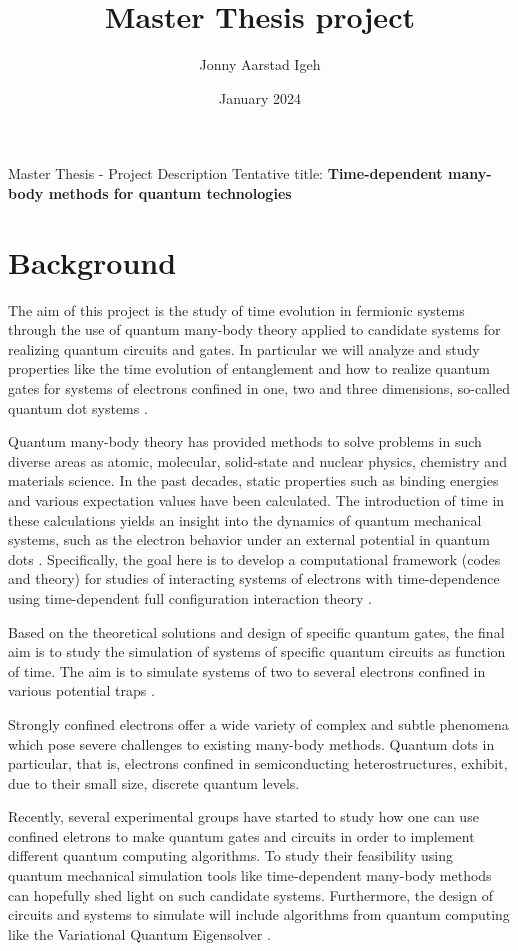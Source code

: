 \documentclass{article}
\title{Master Thesis project}
\author{Jonny Aarstad Igeh}
\date{January 2024}
\begin{document}
\maketitle  

Master Thesis - Project Description
Tentative title: {\bf Time-dependent many-body methods for quantum technologies}

\section{Background}

The aim of this project is the study of time evolution in fermionic
systems through the use of quantum many-body theory applied to
candidate systems for realizing quantum circuits and gates. In
particular we will analyze and study properties like the time evolution of
entanglement and how to realize quantum gates for systems of electrons
confined in one, two and three dimensions, so-called quantum dot systems \cite{Reimann2002}.

Quantum many-body
theory has provided methods to solve problems in such diverse areas as
atomic, molecular, solid-state and nuclear physics, chemistry and
materials science. In the past decades, static properties such as
binding energies and various expectation values have been
calculated. The introduction of time in these calculations yields an
insight into the dynamics of quantum mechanical systems, such as the
electron behavior under an external potential in quantum dots \cite{Reimann2002}.
Specifically, the goal here is to develop a computational framework (codes and theory) for studies of
interacting systems of electrons with time-dependence using time-dependent full
configuration interaction theory \cite{Skattum2013,Hochstuhl2014}.

Based on the theoretical solutions and design of specific quantum
gates, the final aim is to study the simulation of systems of specific quantum
circuits as function of time.  The aim is to simulate systems of two
to several  electrons confined in various potential
traps \cite{us2024}. 

Strongly confined electrons offer a wide variety of complex and subtle
phenomena which pose severe challenges to existing many-body
methods. Quantum dots in particular, that is, electrons confined in
semiconducting heterostructures, exhibit, due to their small size,
discrete quantum levels.

Recently, several experimental groups have started to study how one
can use confined eletrons to make quantum gates and circuits in order
to implement different quantum computing algorithms. To study their
feasibility using quantum mechanical simulation tools like
time-dependent many-body methods can hopefully shed light on such
candidate systems. Furthermore, the design of circuits and systems to
simulate will include algorithms from quantum computing like the
Variational Quantum Eigensolver \cite{vqe}.
\end{document}
